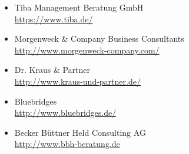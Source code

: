 \documentclass[11pt,a4paper]{article}
\begin{document}
	\begin{itemize}
	\item Tiba Management Beratung GmbH\\
	\textsf{\textcolor{MidnightBlue}{\url{https://www.tiba.de/}}} 

	\item Morgenweck \& Company Business Consultants\\
	\textsf{\textcolor{MidnightBlue}{\url{http://www.morgenweck-company.com/}}}

	\item Dr. Kraus \& Partner\\
	\textsf{\textcolor{MidnightBlue}{\url{http://www.kraus-und-partner.de/}}}

	\item Bluebridges\\
	\textsf{\textcolor{MidnightBlue}{\url{http://www.bluebridges.de/}}}

	\item Becker Büttner Held Consulting AG\\
	\textsf{\textcolor{MidnightBlue}{\url{http://www.bbh-beratung.de}}}

	\end{itemize}
\end{document}
